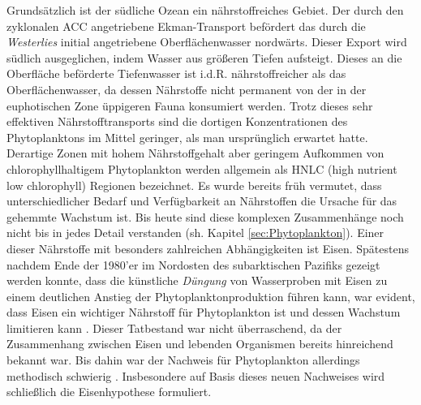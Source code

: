 \documentclass[12pt,a4paper,onecolumn,draft]{scrartcl}
\begin{document}
Grundsätzlich ist der südliche Ozean ein nährstoffreiches Gebiet. Der durch den zyklonalen ACC angetriebene Ekman-Transport befördert das durch die \textit{Westerlies} initial angetriebene Oberflächenwasser nordwärts. Dieser Export wird südlich ausgeglichen, indem Wasser aus größeren Tiefen aufsteigt. Dieses an die Oberfläche beförderte Tiefenwasser ist i.d.R. nährstoffreicher als das Oberflächenwasser, da dessen Nährstoffe nicht permanent von der in der euphotischen Zone üppigeren Fauna konsumiert werden. Trotz dieses sehr effektiven Nährstofftransports sind die dortigen Konzentrationen des Phytoplanktons im Mittel geringer, als man ursprünglich erwartet hatte. Derartige Zonen mit hohem Nährstoffgehalt aber geringem Aufkommen von chlorophyllhaltigem Phytoplankton werden allgemein als HNLC (high nutrient low chlorophyll) Regionen bezeichnet. Es wurde bereits früh vermutet, dass unterschiedlicher Bedarf und Verfügbarkeit an Nährstoffen die Ursache für das gehemmte Wachstum ist. Bis heute sind diese komplexen Zusammenhänge noch nicht bis in jedes Detail verstanden (sh. Kapitel \ref{sec:Phytoplankton}). Einer dieser Nährstoffe mit besonders zahlreichen Abhängigkeiten ist Eisen. Spätestens nachdem Ende der 1980'er im Nordosten des subarktischen Pazifiks gezeigt werden konnte, dass die künstliche \textit{Düngung} von Wasserproben mit Eisen zu einem deutlichen Anstieg der Phytoplanktonproduktion führen kann, war evident, dass Eisen ein wichtiger Nährstoff für Phytoplankton ist und dessen Wachstum limitieren kann \citep{Martin.1988}. Dieser Tatbestand war nicht überraschend, da der Zusammenhang zwischen Eisen und lebenden Organismen bereits hinreichend bekannt war. Bis dahin war der Nachweis für Phytoplankton allerdings methodisch schwierig \citep{Martin.1988}. Insbesondere auf Basis dieses neuen Nachweises wird schließlich die Eisenhypothese formuliert. \\
\end{document}
